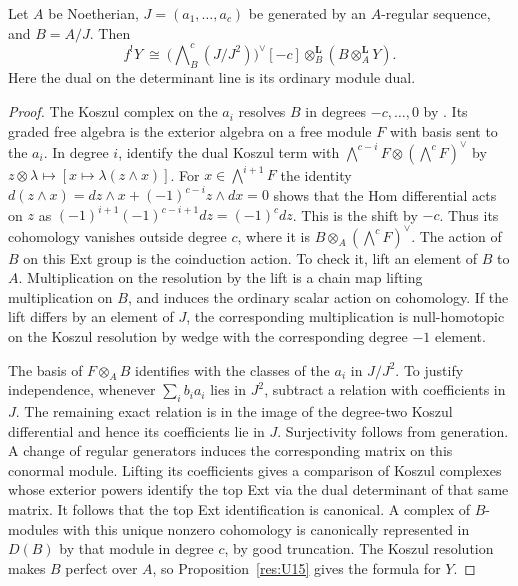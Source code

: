 \begin{corollary}\label{res:U17}
Let \(A\) be Noetherian, \(J=(a_1,\ldots,a_c)\) be generated
by an \(A\)-regular sequence, and \(B=A/J\).
Then
\[
  f^!Y\ \cong\
  \bigl(\textstyle\bigwedge\nolimits^c_B(J/J^2)\bigr)^\vee[-c]
       \otimes_B^{\mathbf L}(B\otimes_A^{\mathbf L}Y).
\]
Here the dual on the determinant line is its ordinary module dual.
\end{corollary}
\begin{proof}
The Koszul complex on the \(a_i\) resolves \(B\) in degrees
\(-c,\ldots,0\) by \cite[RK-07]{ca-core}. Its graded free
algebra is the exterior algebra on a free module \(F\) with
basis sent to the \(a_i\). In degree \(i\), identify the dual
Koszul term with \(\bigwedge^{c-i}F\otimes(\bigwedge^c F)^\vee\)
by \(z\otimes\lambda\mapsto[x\mapsto\lambda(z\wedge x)]\).
For \(x\in\bigwedge^{i+1}F\) the identity
\(d(z\wedge x)=d z\wedge x+(-1)^{c-i}z\wedge d x=0\)
shows that the Hom differential acts on \(z\) as
\((-1)^{i+1}(-1)^{c-i+1}d z=(-1)^c d z\).
This is the shift by \(-c\). Thus
its cohomology vanishes outside degree \(c\), where it is
\(B\otimes_A(\bigwedge^c F)^\vee\). The action of \(B\) on
this Ext group is the coinduction action. To check it, lift an
element of \(B\) to \(A\). Multiplication on the resolution
by the lift is a chain map lifting multiplication on \(B\),
and induces the ordinary scalar action on cohomology.
If the lift differs by an element of \(J\), the corresponding
multiplication is null-homotopic on the Koszul resolution by
wedge with the corresponding degree \(-1\) element.

The basis of \(F\otimes_A B\) identifies with the classes of
the \(a_i\) in \(J/J^2\). To justify independence, whenever
\(\sum_i b_i a_i\) lies in \(J^2\), subtract a relation with
coefficients in \(J\). The remaining exact relation is in
the image of the degree-two Koszul differential and hence its
coefficients lie in \(J\). Surjectivity follows from generation.
A change of regular generators induces the corresponding
matrix on this conormal module. Lifting its coefficients
gives a comparison of Koszul complexes whose exterior
powers identify the top Ext via the dual determinant of
that same matrix. It follows that the top Ext identification
is canonical. A complex of \(B\)-modules with this unique
nonzero cohomology is canonically represented in \(D(B)\)
by that module in degree \(c\), by good truncation.
The Koszul resolution makes \(B\) perfect over \(A\), so
Proposition~\ref{res:U15} gives the formula for \(Y\).
\end{proof}

